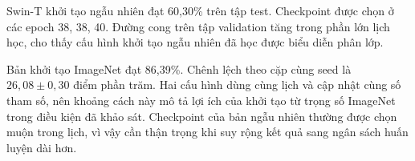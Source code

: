Swin-T khởi tạo ngẫu nhiên đạt 60,30\% trên tập test. Checkpoint được chọn ở các epoch 38, 38, 40. Đường cong trên tập validation tăng trong phần lớn lịch học, cho thấy cấu hình khởi tạo ngẫu nhiên đã học được biểu diễn phân lớp.

Bản khởi tạo ImageNet đạt 86,39\%. Chênh lệch theo cặp cùng seed là $26{,}08 \pm 0{,}30$ điểm phần trăm. Hai cấu hình dùng cùng lịch và cập nhật cùng số tham số, nên khoảng cách này mô tả lợi ích của khởi tạo từ trọng số ImageNet trong điều kiện đã khảo sát. Checkpoint của bản ngẫu nhiên thường được chọn muộn trong lịch, vì vậy cần thận trọng khi suy rộng kết quả sang ngân sách huấn luyện dài hơn.
